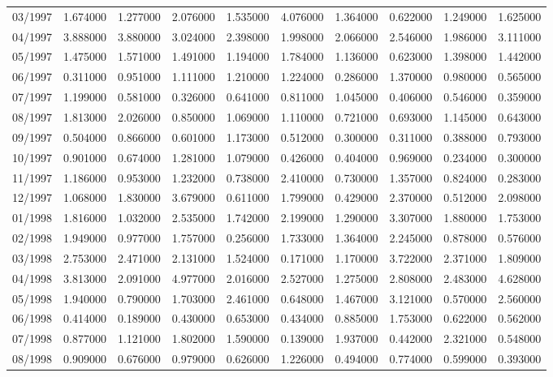 \begin{tabular}{lrrrrrrrrr}
03/1997 & 1.674000 & 1.277000 & 2.076000 & 1.535000 & 4.076000 & 1.364000 & 0.622000 & 1.249000 & 1.625000 \\
04/1997 & 3.888000 & 3.880000 & 3.024000 & 2.398000 & 1.998000 & 2.066000 & 2.546000 & 1.986000 & 3.111000 \\
05/1997 & 1.475000 & 1.571000 & 1.491000 & 1.194000 & 1.784000 & 1.136000 & 0.623000 & 1.398000 & 1.442000 \\
06/1997 & 0.311000 & 0.951000 & 1.111000 & 1.210000 & 1.224000 & 0.286000 & 1.370000 & 0.980000 & 0.565000 \\
07/1997 & 1.199000 & 0.581000 & 0.326000 & 0.641000 & 0.811000 & 1.045000 & 0.406000 & 0.546000 & 0.359000 \\
08/1997 & 1.813000 & 2.026000 & 0.850000 & 1.069000 & 1.110000 & 0.721000 & 0.693000 & 1.145000 & 0.643000 \\
09/1997 & 0.504000 & 0.866000 & 0.601000 & 1.173000 & 0.512000 & 0.300000 & 0.311000 & 0.388000 & 0.793000 \\
10/1997 & 0.901000 & 0.674000 & 1.281000 & 1.079000 & 0.426000 & 0.404000 & 0.969000 & 0.234000 & 0.300000 \\
11/1997 & 1.186000 & 0.953000 & 1.232000 & 0.738000 & 2.410000 & 0.730000 & 1.357000 & 0.824000 & 0.283000 \\
12/1997 & 1.068000 & 1.830000 & 3.679000 & 0.611000 & 1.799000 & 0.429000 & 2.370000 & 0.512000 & 2.098000 \\
01/1998 & 1.816000 & 1.032000 & 2.535000 & 1.742000 & 2.199000 & 1.290000 & 3.307000 & 1.880000 & 1.753000 \\
02/1998 & 1.949000 & 0.977000 & 1.757000 & 0.256000 & 1.733000 & 1.364000 & 2.245000 & 0.878000 & 0.576000 \\
03/1998 & 2.753000 & 2.471000 & 2.131000 & 1.524000 & 0.171000 & 1.170000 & 3.722000 & 2.371000 & 1.809000 \\
04/1998 & 3.813000 & 2.091000 & 4.977000 & 2.016000 & 2.527000 & 1.275000 & 2.808000 & 2.483000 & 4.628000 \\
05/1998 & 1.940000 & 0.790000 & 1.703000 & 2.461000 & 0.648000 & 1.467000 & 3.121000 & 0.570000 & 2.560000 \\
06/1998 & 0.414000 & 0.189000 & 0.430000 & 0.653000 & 0.434000 & 0.885000 & 1.753000 & 0.622000 & 0.562000 \\
07/1998 & 0.877000 & 1.121000 & 1.802000 & 1.590000 & 0.139000 & 1.937000 & 0.442000 & 2.321000 & 0.548000 \\
08/1998 & 0.909000 & 0.676000 & 0.979000 & 0.626000 & 1.226000 & 0.494000 & 0.774000 & 0.599000 & 0.393000 \\

\end{tabular}
